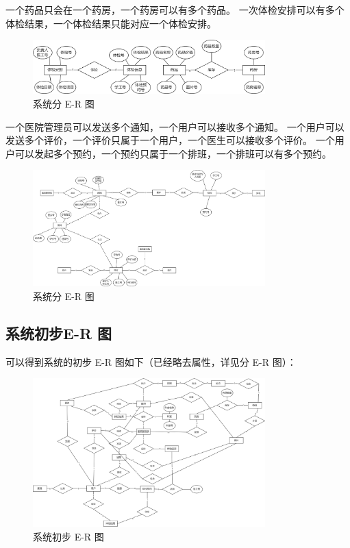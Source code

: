 \documentclass{article}
\begin{document}
一个药品只会在一个药房，一个药房可以有多个药品。
一次体检安排可以有多个体检结果，一个体检结果只能对应一个体检安排。

\begin{figure}[H]
    \centering
    \includegraphics[width=0.8\textwidth]{images/dividedER4.png}
    \caption{系统分 E-R 图}
\end{figure}

一个医院管理员可以发送多个通知，一个用户可以接收多个通知。
一个用户可以发送多个评价，一个评价只属于一个用户，一个医生可以接收多个评价。
一个用户可以发起多个预约，一个预约只属于一个排班，一个排班可以有多个预约。

\begin{figure}[H]
    \centering
    \includegraphics[width=0.8\textwidth]{images/dividedER5.png}
    \caption{系统分 E-R 图}
\end{figure}

\subsection{系统初步E-R 图}

可以得到系统的初步 E-R 图如下（已经略去属性，详见分 E-R 图）：

\begin{figure}[H]
    \centering
    \includegraphics[width=0.8\textwidth]{images/initER.png}
    \caption{系统初步 E-R 图}
\end{figure}
\end{document}
